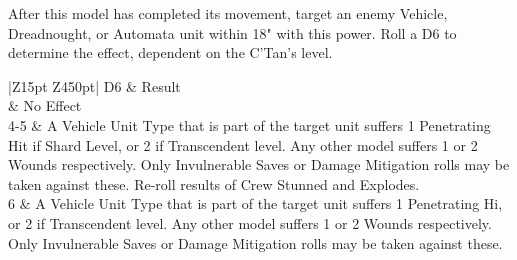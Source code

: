  \label{Voltaic Storm}

After this model has completed its movement, target an enemy Vehicle, Dreadnought, or Automata unit within 18" with this power. Roll a D6 to determine the effect, dependent on the C'Tan's level.

\begin{tabular}{|Z{15pt} Z{450pt}|}
	\hline
	D6 & Result \\
	 & No Effect \\
	4-5 &  A Vehicle Unit Type that is part of the target unit suffers 1 Penetrating Hit if Shard Level, or 2 if Transcendent level. Any other model suffers 1 or 2 Wounds respectively. Only Invulnerable Saves or Damage Mitigation rolls may be taken against these. Re-roll results of Crew Stunned and Explodes. \\
	6 &  A Vehicle Unit Type that is part of the target unit suffers 1 Penetrating Hi, or 2 if Transcendent level. Any other model suffers 1 or 2 Wounds respectively. Only Invulnerable Saves or Damage Mitigation rolls may be taken against these. \\
	\hline
\end{tabular}

